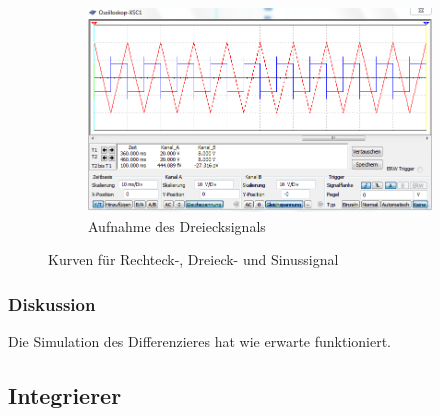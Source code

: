 \documentclass[12pt,a4paper]{article}
\begin{document}
\begin{figure}[H]
        \hfill
        \begin{subfigure}[t]{0.28\textwidth}
                \includegraphics[width=\textwidth , scale = 0.4]{4_3_drei.PNG}
                \caption[Aufnahme des Dreiecksignals]{Aufnahme des Dreiecksignals}
  				\label{fig:4_3_drei}
        \end{subfigure}
        \caption{Kurven  für Rechteck-, Dreieck- und Sinussignal}
        \label{fig:4_3}
\end{figure}

\subsubsection{Diskussion}

Die Simulation des Differenzieres hat wie erwarte funktioniert.

\subsection{Integrierer}
\end{document}
